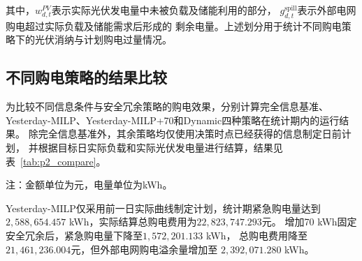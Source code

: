 其中，$w_{d,t}^{PV}$表示实际光伏发电量中未被负载及储能利用的部分，
$g_{d,t}^{\mathrm{spill}}$表示外部电网购电超过实际负载及储能需求后形成的
剩余电量。上述划分用于统计不同购电策略下的光伏消纳与计划购电过量情况。


\subsection{不同购电策略的结果比较}

为比较不同信息条件与安全冗余策略的购电效果，分别计算完全信息基准、
Yesterday-MILP、Yesterday-MILP+70和Dynamic四种策略在统计期内的运行结果。
除完全信息基准外，其余策略均仅使用决策时点已经获得的信息制定日前计划，
并根据目标日实际负载和实际光伏发电量进行结算，结果见表~\ref{tab:p2_compare}。

\begin{table}[H]
\centering
\caption{不同购电策略的统计期运行结果}
\label{tab:p2_compare}
\small
{}
\begin{flushleft}
\footnotesize 注：金额单位为元，电量单位为kWh。
\end{flushleft}
\end{table}
Yesterday-MILP仅采用前一日实际曲线制定计划，统计期紧急购电量达到
$2,588,654.457$ kWh，实际结算总购电费用为$22,823,747.293$元。
增加70 kWh固定安全冗余后，紧急购电量下降至$1,572,201.133$ kWh，
总购电费用降至$21,461,236.004$元，但外部电网购电溢余量增加至
$2,392,071.280$ kWh。

